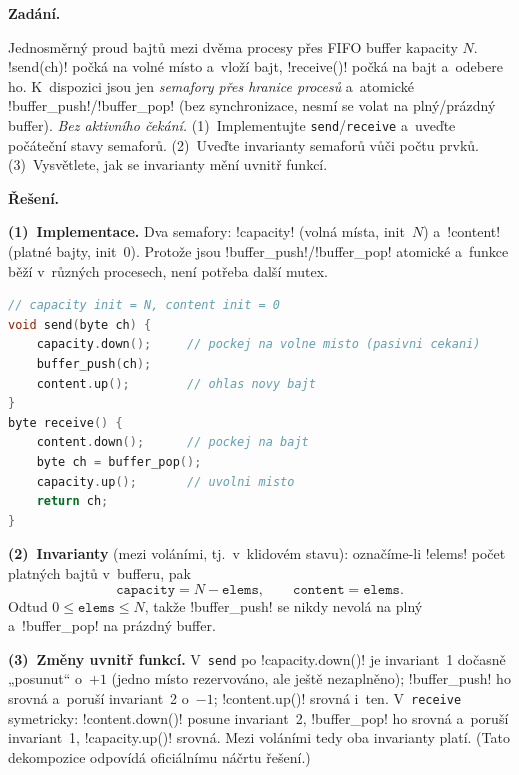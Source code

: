 \begin{priklad}
\par
\textbf{Zadání.}\par
Jednosměrný proud bajtů mezi dvěma procesy přes FIFO buffer kapacity $N$. \cd!send(ch)! počká na volné místo a~vloží bajt, \cd!receive()! počká na bajt a~odebere ho. K~dispozici jsou jen \emph{semafory přes hranice procesů} a~atomické \cd!buffer_push!/\cd!buffer_pop! (bez synchronizace, nesmí se volat na plný/prázdný buffer). \emph{Bez aktivního čekání.} (1)~Implementujte \texttt{send}/\texttt{receive} a~uveďte počáteční stavy semaforů. (2)~Uveďte invarianty semaforů vůči počtu prvků. (3)~Vysvětlete, jak se invarianty mění uvnitř funkcí.

\medskip
\textbf{Řešení.}\par
\textbf{(1)~Implementace.} Dva semafory: \cd!capacity! (volná místa, init~$N$) a~\cd!content! (platné bajty, init~0). Protože jsou \cd!buffer_push!/\cd!buffer_pop! atomické a~funkce běží v~různých procesech, není potřeba další mutex.
\begin{lstlisting}[language=C]
// capacity init = N, content init = 0
void send(byte ch) {
    capacity.down();     // pockej na volne misto (pasivni cekani)
    buffer_push(ch);
    content.up();        // ohlas novy bajt
}
byte receive() {
    content.down();      // pockej na bajt
    byte ch = buffer_pop();
    capacity.up();       // uvolni misto
    return ch;
}
\end{lstlisting}
\textbf{(2)~Invarianty} (mezi voláními, tj.\ v~klidovém stavu): označíme-li \cd!elems! počet platných bajtů v~bufferu, pak
\[
\texttt{capacity} = N - \texttt{elems}, \qquad \texttt{content} = \texttt{elems}.
\]
Odtud $0\le\texttt{elems}\le N$, takže \cd!buffer_push! se nikdy nevolá na plný a~\cd!buffer_pop! na prázdný buffer.

\textbf{(3)~Změny uvnitř funkcí.} V~\texttt{send} po \cd!capacity.down()! je invariant~1 dočasně „posunut`` o~$+1$ (jedno místo rezervováno, ale ještě nezaplněno); \cd!buffer_push! ho srovná a~poruší invariant~2 o~$-1$; \cd!content.up()! srovná i~ten. V~\texttt{receive} symetricky: \cd!content.down()! posune invariant~2, \cd!buffer_pop! ho srovná a~poruší invariant~1, \cd!capacity.up()! srovná. Mezi voláními tedy oba invarianty platí. (Tato dekompozice odpovídá oficiálnímu náčrtu řešení.)
\end{priklad}
